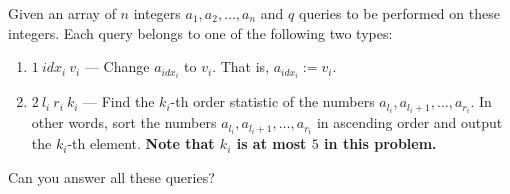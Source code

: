 Given an array of $n$ integers $a_1,a_2,\ldots,a_n$ and $q$ queries to be performed on these integers. Each query belongs to one of the following two types:
\begin{enumerate}
    \item $1\ idx_i\ v_i$ — Change $a_{idx_i}$ to $v_i$. That is, $a_{idx_i} := v_i$.
    \item $2\ l_i\ r_i\ k_i$ — Find the $k_i$-th order statistic of the numbers $a_{l_i},a_{l_i+1},\ldots,a_{r_i}$.
    In other words, sort the numbers $a_{l_i},a_{l_i+1},\ldots,a_{r_i}$ in ascending order and output the $k_i$-th element.
    \textbf{Note that $k_i$ is at most $5$ in this problem.}
\end{enumerate}
Can you answer all these queries?
